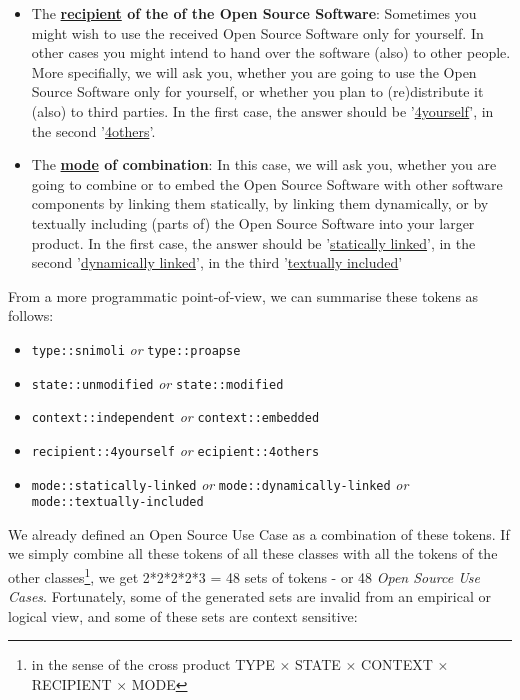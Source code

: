 \begin{itemize}
  \item The \textbf{\underline{recipient} of the of the Open Source Software}:
  Sometimes you might wish to use the received Open Source Software only for
  yourself. In other cases you might intend to hand over the software (also) to
  other people. More specifially, we will ask you, whether you are going to use
  the Open Source Software only for yourself, or whether you plan to
  (re)distribute it (also) to third parties. In the first case, the answer
  should be '\underline{4yourself}', in the second '\underline{4others}'.
 
  \item The \textbf{\underline{mode} of combination}: In this case, we will ask
  you, whether you are going to combine or to embed the Open Source Software
  with other software components by linking them statically, by linking them
  dynamically, or by textually including (parts of) the Open Source Software
  into your larger product. In the first case, the answer should be
  '\underline{statically linked}', in the second '\underline{dynamically
  linked}', in the third '\underline{textually included}'
  
\end{itemize}

From a more programmatic point-of-view, we can summarise these tokens as follows:

\begin{itemize}
  \item \texttt{type::snimoli} \emph{or} \texttt{type::proapse}
  \item \texttt{state::unmodified} \emph{or} \texttt{state::modified}
  \item \texttt{context::independent} \emph{or} \texttt{context::embedded}
  \item \texttt{recipient::4yourself} \emph{or} \texttt{ecipient::4others}
  \item \texttt{mode::statically-linked} \emph{or} \texttt{mode::dynamically-linked}
   \emph{or} \\ \texttt{mode::textually-included}
\end{itemize}

We already defined an Open Source Use Case as a combination of these tokens. If
we simply combine all these tokens of all these classes with all the tokens of
the other classes\footnote{in the sense of the cross product TYPE $\times$ STATE
$\times$ CONTEXT $\times$ RECIPIENT $\times$ MODE}, we get 2*2*2*2*3 = 48 sets
of tokens - or 48 \emph{Open Source Use Cases}. Fortunately, some of the
generated sets are invalid from an empirical or logical view, and some of these
sets are context sensitive:

